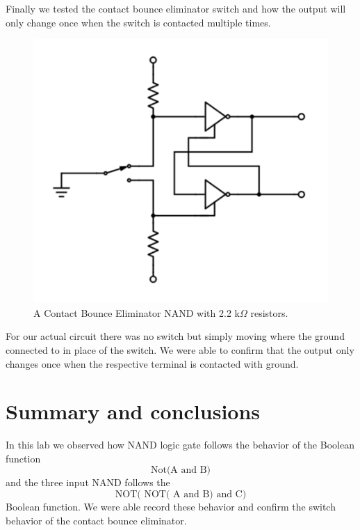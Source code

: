 \documentclass[11pt,letterpaper,onecolumn]{article}
\begin{document}
Finally we tested the contact bounce eliminator switch and how the output will only change once when the switch is contacted multiple times.

\begin{figure}[H]
    \centering
    \includegraphics[scale = .75]{cross1.pdf}
    \caption{A Contact Bounce Eliminator NAND with 2.2 k$\Omega$ resistors.}
    \label{fig:data2}
\end{figure} 

For our actual circuit there was no switch but simply moving where the ground connected to in place of the switch. We were able to confirm that the output only changes once when the respective terminal is contacted with ground. 

\section{Summary and conclusions}

In this lab we observed how NAND logic gate follows the behavior of the Boolean function
$$\text{Not(A and B)}$$
and the three input NAND follows the 
$$\text{NOT( NOT( A and B) and C)}$$
Boolean function. We were able record these behavior and confirm the switch behavior of the contact bounce eliminator. 








\end{document}
